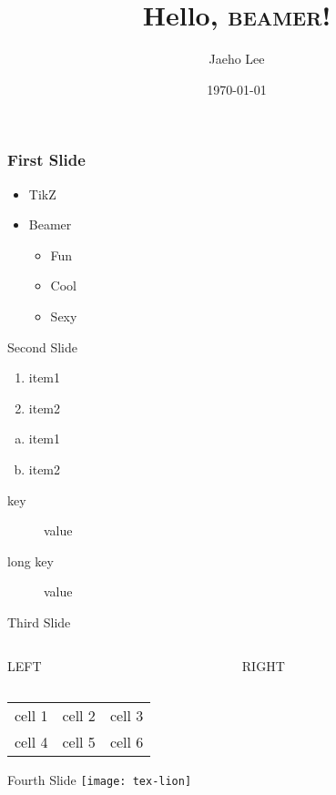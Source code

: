 \documentclass{beamer}
\title{Hello, \textsc{beamer}!}
\author{Jaeho Lee}
\date{\today}
\begin{document}
\maketitle
\begin{frame}
  \frametitle{First Slide}
  \begin{itemize}
    \item TikZ
    \item Beamer
      \begin{itemize}
        \item Fun
        \item Cool
        \item Sexy
      \end{itemize}
  \end{itemize}
\end{frame}
\begin{frame}{Second Slide}
  \begin{enumerate}
    \item item1
    \item item2
  \end{enumerate}
  \begin{enumerate}[(a)]
    \item item1
    \item item2
  \end{enumerate}
  \begin{description}
    \item[key] value
    \item[long key] value
  \end{description}
\end{frame}
\begin{frame}{Third Slide}
  \begin{columns}
    \begin{column}{0.5\textwidth}
      \LARGE LEFT
    \end{column}
    \begin{column}{0.5\textwidth}
      \LARGE RIGHT
    \end{column}
  \end{columns}
  \vspace{2cm}
  \begin{center}
    \begin{tabular}{ccc}
      cell 1 & cell 2 & cell 3\\
      cell 4 & cell 5 & cell 6
    \end{tabular}
  \end{center}
\end{frame}
\begin{frame}{Fourth Slide}
  \texttt{[image: tex-lion]}
\end{frame}
\end{document}
